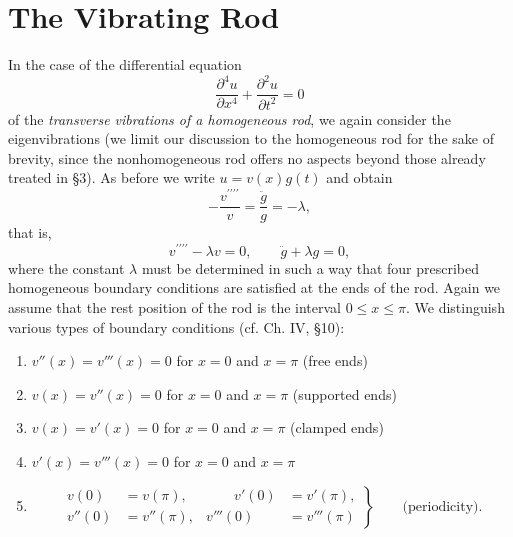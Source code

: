 \section{The Vibrating Rod}
In the case of the differential equation
\[
\frac{\partial^4u}{\partial x^4}+\frac{\partial^2u}{\partial t^2}=0
\]
of the \emph{transverse vibrations of a homogeneous rod}, we again consider the eigenvibrations (we limit our discussion to the homogeneous rod for the sake of brevity, since the nonhomogeneous rod offers no aspects beyond those already treated in \S3). As before we write $u=v(x)g(t)$ and obtain
\[
-\frac{v^{\prime\prime\prime\prime}}{v}=\frac{\ddot g}{g}=-\lambda,
\]
that is,
\begin{equation}\tag{21}
v^{\prime\prime\prime\prime}-\lambda v=0,
\qquad
\ddot g+\lambda g=0,
\end{equation}
where the constant $\lambda$ must be determined in such a way that four prescribed homogeneous boundary conditions are satisfied at the ends of the rod. Again we assume that the rest position of the rod is the interval $0\le x\le\pi$. We distinguish various types of boundary conditions (cf. Ch. IV, \S10):
\begin{enumerate}[label=\arabic*.,leftmargin=2.3em,itemsep=.35em]
\item $v''(x)=v'''(x)=0$ for $x=0$ and $x=\pi$ \hfill (free ends)
\item $v(x)=v''(x)=0$ for $x=0$ and $x=\pi$ \hfill (supported ends)
\item $v(x)=v'(x)=0$ for $x=0$ and $x=\pi$ \hfill (clamped ends)
\item $v'(x)=v'''(x)=0$ for $x=0$ and $x=\pi$
\item
\[
\left.
\begin{aligned}
v(0)&=v(\pi),&\qquad v'(0)&=v'(\pi),\\
v''(0)&=v''(\pi),& v'''(0)&=v'''(\pi)
\end{aligned}
\right\}
\qquad\text{(periodicity).}
\]
\end{enumerate}

